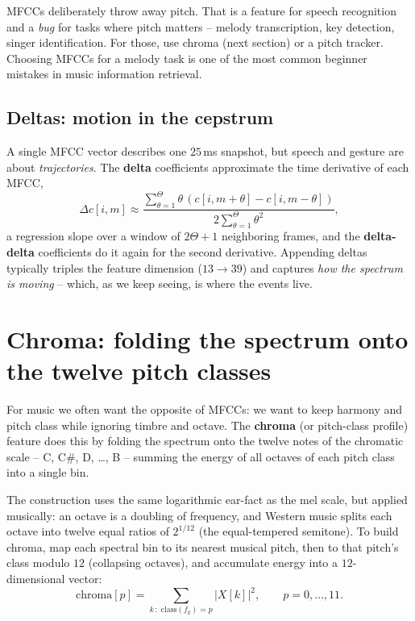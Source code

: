 \begin{trapbox}
MFCCs deliberately throw away pitch. That is a feature for speech recognition and
a \emph{bug} for tasks where pitch matters -- melody transcription, key
detection, singer identification. For those, use chroma (next section) or a pitch
tracker. Choosing MFCCs for a melody task is one of the most common beginner
mistakes in music information retrieval.
\end{trapbox}

\subsection*{Deltas: motion in the cepstrum}

A single MFCC vector describes one $25$\,ms snapshot, but speech and gesture are
about \emph{trajectories}. The \textbf{delta} coefficients approximate the time
derivative of each MFCC,
\begin{equation}
\label{ch27:delta}
\Delta c[i,m] \approx \frac{\sum_{\theta=1}^{\Theta}\theta\,(c[i,m+\theta]-c[i,m-\theta])}
                            {2\sum_{\theta=1}^{\Theta}\theta^2},
\end{equation}
a regression slope over a window of $2\Theta+1$ neighboring frames, and the \textbf{delta-delta}
coefficients do it again for the second derivative. Appending deltas typically
triples the feature dimension ($13 \to 39$) and captures \emph{how the spectrum is
moving} -- which, as we keep seeing, is where the events live.

\section{Chroma: folding the spectrum onto the twelve pitch classes}
\label{ch27:chroma}

For music we often want the opposite of MFCCs: we want to keep harmony and pitch
class while ignoring timbre and octave. The \textbf{chroma} (or pitch-class
profile) feature does this by folding the spectrum onto the twelve notes of the
chromatic scale -- C, C\#, D, \dots, B -- summing the energy of all octaves of
each pitch class into a single bin.

The construction uses the same logarithmic ear-fact as the mel scale, but applied
musically: an octave is a doubling of frequency, and Western music splits each
octave into twelve equal ratios of $2^{1/12}$ (the equal-tempered semitone). To
build chroma, map each spectral bin to its nearest musical pitch, then to that
pitch's class modulo $12$ (collapsing octaves), and accumulate energy into a
$12$-dimensional vector:
\begin{equation}
\label{ch27:chroma-defn}
\text{chroma}[p] = \sum_{k\,:\;\text{class}(f_k)=p} |X[k]|^2,
\qquad p = 0,\dots,11.
\end{equation}


